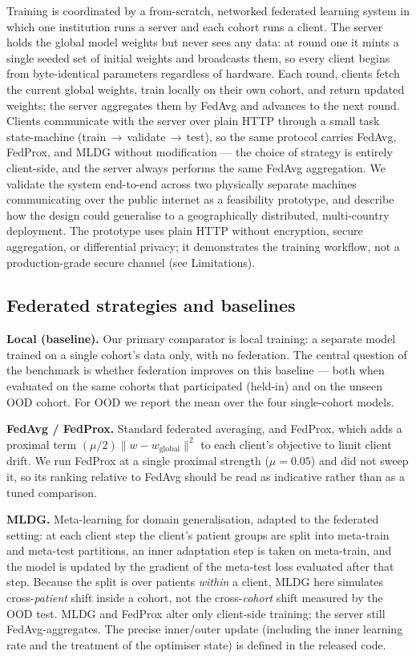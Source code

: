 \documentclass[10pt,letterpaper]{article}
\begin{document}
Training is coordinated by a from-scratch, networked federated learning system
in which one institution runs a server and each cohort runs a client. The server
holds the global model weights but never sees any data: at round one it mints a
single seeded set of initial weights and broadcasts them, so every client begins
from byte-identical parameters regardless of hardware. Each round, clients fetch
the current global weights, train locally on their own cohort, and return updated
weights; the server aggregates them by FedAvg and advances to the next round.
Clients communicate with the server over plain HTTP through a small task
state-machine (train\,$\rightarrow$\,validate\,$\rightarrow$\,test), so the same
protocol carries FedAvg, FedProx, and MLDG without modification --- the choice of
strategy is entirely client-side, and the server always performs the same FedAvg
aggregation. We validate the system end-to-end across two physically separate
machines communicating over the public internet as a feasibility prototype, and
describe how the design could generalise to a geographically distributed,
multi-country deployment. The prototype uses plain HTTP without encryption,
secure aggregation, or differential privacy; it demonstrates the training
workflow, not a production-grade secure channel (see Limitations).

\subsection*{Federated strategies and baselines}

\textbf{Local (baseline).} Our primary comparator is local training: a separate
model trained on a single cohort's data only, with no federation. The central
question of the benchmark is whether federation improves on this baseline ---
both when evaluated on the same cohorts that participated (held-in) and on the
unseen OOD cohort. For OOD we report the mean over the four single-cohort models.

\textbf{FedAvg / FedProx.} Standard federated averaging, and FedProx, which adds
a proximal term $(\mu/2)\lVert w - w_{\text{global}}\rVert^2$ to each client's
objective to limit client drift. We run FedProx at a single proximal strength
($\mu=0.05$) and did not sweep it, so its ranking relative to FedAvg should be
read as indicative rather than as a tuned comparison.

\textbf{MLDG.} Meta-learning for domain generalisation, adapted to the federated
setting: at each client step the client's patient groups are split into
meta-train and meta-test partitions, an inner adaptation step is taken on
meta-train, and the model is updated by the gradient of the meta-test loss
evaluated after that step. Because the split is over patients \emph{within} a
client, MLDG here simulates cross-\emph{patient} shift inside a cohort, not the
cross-\emph{cohort} shift measured by the OOD test. MLDG and FedProx alter only
client-side training; the server still FedAvg-aggregates. The precise inner/outer
update (including the inner learning rate and the treatment of the optimiser
state) is defined in the released code.
\end{document}
